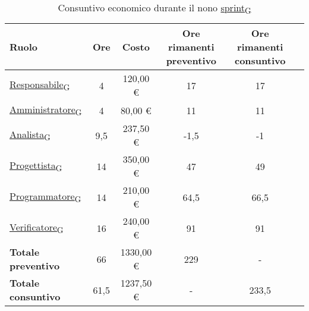 \newpage
{} 
\begin{table}[!h]
    \centering
    \begin{tabular}{ | l | c | c | c | c | c | }
        \hline
        \textbf{Ruolo} & \textbf{Ore} & \textbf{Costo} & \textbf{Ore rimanenti preventivo} & \textbf{Ore rimanenti consuntivo} \\
        \hline
        \href{https://7last.github.io/docs/pb/documentazione-interna/glossario\#responsabile}{Responsabile\textsubscript{G}}     &  4   &  120,00 € &  17   &  17   \\
        \href{https://7last.github.io/docs/pb/documentazione-interna/glossario\#amministratore}{Amministratore\textsubscript{G}} &  4   &   80,00 € &  11   &  11   \\
        \href{https://7last.github.io/docs/pb/documentazione-interna/glossario\#analista}{Analista\textsubscript{G}}             &  9,5 &  237,50 € &  -1,5 &  -1   \\
        \href{https://7last.github.io/docs/pb/documentazione-interna/glossario\#progettista}{Progettista\textsubscript{G}}       & 14   &  350,00 € &  47   &  49   \\
        \href{https://7last.github.io/docs/pb/documentazione-interna/glossario\#programmatore}{Programmatore\textsubscript{G}}   & 14   &  210,00 € &  64,5 &  66,5 \\
        \href{https://7last.github.io/docs/pb/documentazione-interna/glossario\#verificatore}{Verificatore\textsubscript{G}}     & 16   &  240,00 € &  91   &  91   \\
        \hline
        \textbf{Totale preventivo} &  66   & 1330,00 € & 229   &    -   \\
        \hline
        \textbf{Totale consuntivo} &  61,5 & 1237,50 € &   -   &  233,5 \\
        \hline
    \end{tabular}
    \caption{Consuntivo economico durante il nono \href{https://7last.github.io/docs/pb/documentazione-interna/glossario\#sprint}{sprint\textsubscript{G}}}

\end{table}

